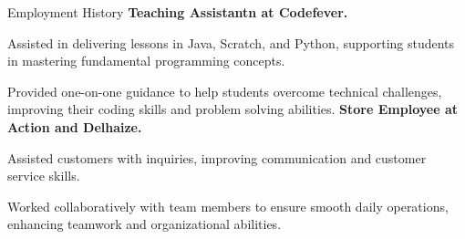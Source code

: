 \begin{rubric}{Employment History}
\entry*[2023 - To Date]%
	\textbf{Teaching Assistantn at Codefever.}\par
	Assisted in delivering lessons in Java, Scratch, and Python, 
	supporting students in mastering fundamental programming 
	concepts.
	\par
	Provided one-on-one guidance to help students overcome 
	technical challenges, improving their coding skills and problem
	solving abilities. 
%
%
\entry*[2021 -- To Date]%
	\textbf{Store Employee at Action and Delhaize.}\par
	Assisted customers with inquiries, improving communication and 
	customer service skills. 
	\par
	Worked collaboratively with team members to ensure smooth 
	daily operations, enhancing teamwork and organizational 
	abilities.
%
\end{rubric}